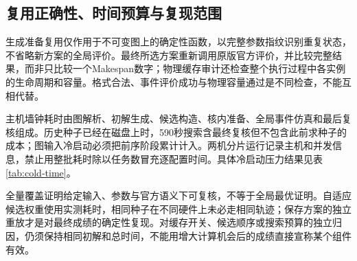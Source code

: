 \subsection{复用正确性、时间预算与复现范围}
生成准备复用仅作用于不可变图上的确定性函数，以完整参数指纹识别重复状态，不省略新方案的全局评价。最终所选方案重新调用原版官方评价，并比较完整结果，而非只比较一个Makespan数字；物理缓存审计还检查整个执行过程中各实例的生命周期和容量。格式合法、事件评价成功与物理容量通过是不同检查，不能互相代替。

主机墙钟耗时由图解析、初解生成、候选构造、核内准备、全局事件仿真和最后复核组成。历史种子已经在磁盘上时，590秒搜索含最终复核但不包含此前求种子的成本；图输入冷启动必须把前序阶段累计计入。两机分片运行记录主机和并发信息，禁止用整批耗时除以任务数冒充逐配置时间。具体冷启动压力结果见表\ref{tab:cold-time}。

全量覆盖证明给定输入、参数与官方语义下可复核，不等于全局最优证明。自适应候选权重使用实测耗时，相同种子在不同硬件上未必走相同轨迹；保存方案的独立重放才是对最终成绩的确定性复现。对缓存开关、候选顺序或搜索预算的独立归因，仍须保持相同初解和总时间，不能用增大计算机会后的成绩直接宣称某个组件有效。

